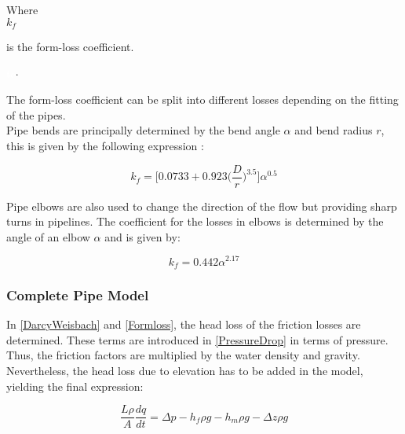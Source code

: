  \begin{minipage}[t]{0.20\textwidth}
Where\\
\hspace*{8mm} $k_f$ 
\end{minipage}
\begin{minipage}[t]{0.68\textwidth}
\vspace*{2mm}
is the form-loss coefficient.  
 \end{minipage}
\begin{minipage}[t]{0.10\textwidth}
\vspace*{2mm}
\textcolor{White}{te}$\unit{\cdot}$
\end{minipage}

The form-loss coefficient can be split into different losses depending on the 
fitting of the pipes. 
\\
Pipe bends are principally determined by the 
bend angle $\alpha$ and bend radius $r$, this is given by the following 
expression \cite{Design_Water}: 

\begin{equation}
  k_f = \bigg[0.0733 + 0.923 \bigg(\frac{D}{r}\bigg)^{3.5}\bigg]\alpha^{0.5}
  \label{kfriction}
\end{equation}

Pipe elbows are also used to change the direction of the flow but providing 
sharp turns in pipelines. The coefficient for the losses in elbows is determined by the angle of an elbow $\alpha$ and is given by:

\begin{equation}
  k_f = 0.442\alpha^{2.17}
\end{equation}

\subsubsection{Complete Pipe Model}
\label{CompletePipe}    %
In \eqref{DarcyWeisbach} and \eqref{Formloss}, the head loss of the friction losses are determined. These terms are introduced in \eqref{PressureDrop} in terms of pressure. Thus, the friction factors are multiplied by the water density and gravity. Nevertheless, the head loss due to elevation has to be added in the model, yielding the final expression:

\begin{equation}
   \frac{L \rho}{A} \frac{dq}{dt} =\Delta p - h_f \rho g - h_m \rho g - \Delta z \rho 
   g
\end{equation}


